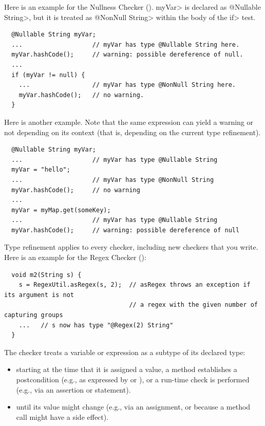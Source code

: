 
Here is an example for the Nullness Checker
().
\<myVar> is declared as \<@Nullable String>, but
it is treated as \<@NonNull String> within the body of the \<if> test.

\begin{Verbatim}
  @Nullable String myVar;
  ...                   // myVar has type @Nullable String here.
  myVar.hashCode();     // warning: possible dereference of null.
  ...
  if (myVar != null) {
    ...                 // myVar has type @NonNull String here.
    myVar.hashCode();   // no warning.
  }
\end{Verbatim}

Here is another example.
Note that the same expression can yield a
warning or not depending on its context (that is, depending on the current
type refinement).

\begin{Verbatim}
  @Nullable String myVar;
  ...                   // myVar has type @Nullable String
  myVar = "hello";
  ...                   // myVar has type @NonNull String
  myVar.hashCode();     // no warning
  ...
  myVar = myMap.get(someKey);
  ...                   // myVar has type @Nullable String
  myVar.hashCode();     // warning: possible dereference of null
\end{Verbatim}

Type refinement applies to every checker, including new
checkers that you write.  Here is an example for the Regex Checker
():

\begin{Verbatim}
  void m2(String s) {
    s = RegexUtil.asRegex(s, 2);  // asRegex throws an exception if its argument is not
                                  // a regex with the given number of capturing groups
    ...   // s now has type "@Regex(2) String"
  }
\end{Verbatim}



The checker treats a variable or expression as a subtype of its declared type:
\begin{itemize}
\item
  starting at the time that
  it is assigned a value,
  a method establishes a postcondition (e.g., as
  expressed by  or
  ), or
  a run-time check is performed (e.g., via an assertion or
   statement).
\item
until its value might change (e.g.,
via an assignment, or because a method call might have a side effect).
\end{itemize}

